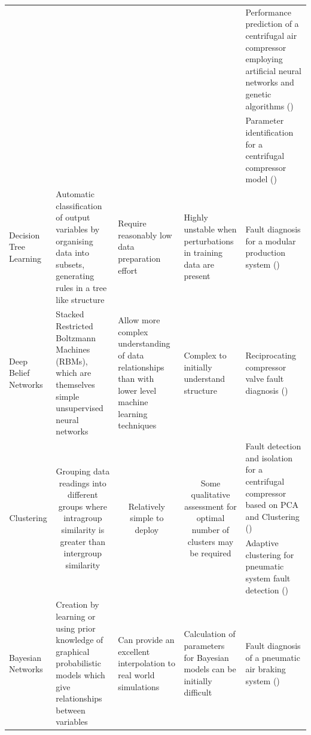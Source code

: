 \begin{center}
\begin{longtable}{p{}p{}p{}p{}p{}}
    \multicolumn{1}{c}{} & \multicolumn{1}{c}{} & \multicolumn{1}{c}{} & \multicolumn{1}{c}{} & Performance prediction of a centrifugal air compressor employing artificial neural networks and genetic algorithms (\cite{LuoFangqiong2011})\\
    \multicolumn{1}{c}{} & \multicolumn{1}{c}{} & \multicolumn{1}{c}{} & \multicolumn{1}{c}{} & Parameter identification for a centrifugal compressor model (\cite{Xiaogang2013})\\
    \midrule
    Decision Tree Learning & Automatic classification of output variables by organising data into subsets, generating rules in a tree like structure & Require reasonably low data preparation effort & Highly unstable when perturbations in training data are present & Fault diagnosis for a modular production system (\cite{Demetgul2013})\\
    \midrule
    Deep Belief Networks & Stacked Restricted Boltzmann Machines (RBMs), which are themselves simple unsupervised neural networks & Allow more complex understanding of data relationships than with lower level machine learning techniques & Complex to initially understand structure & Reciprocating compressor valve fault diagnosis (\cite{Tran2014})\\
    \midrule
    \multicolumn{1}{c}{\multirow{2}[0]{.18\textwidth}{Clustering}} & \multicolumn{1}{c}{\multirow{2}[0]{.18\textwidth}{Grouping data readings into different groups where intragroup similarity is greater than intergroup similarity}} & \multicolumn{1}{c}{\multirow{2}[0]{.18\textwidth}{Relatively simple to deploy}} & \multicolumn{1}{c}{\multirow{2}[0]{.18\textwidth}{Some qualitative assessment for optimal number of clusters may be required}} & Fault detection and isolation for a centrifugal compressor based on PCA and Clustering (\cite{Zanoli2010})\\
    \multicolumn{1}{c}{} & \multicolumn{1}{c}{} & \multicolumn{1}{c}{} & \multicolumn{1}{c}{} & Adaptive clustering for pneumatic system fault detection (\cite{Petkovic2012})\\
    \midrule
    \multirow{2}{.18\textwidth}{Bayesian Networks} & \multirow{2}{.18\textwidth}{Creation by learning or using prior knowledge of graphical probabilistic models which give relationships between variables} & \multirow{2}{.18\textwidth}{Can provide an excellent interpolation to real world simulations} & \multirow{2}{.18\textwidth}{Calculation of parameters for Bayesian models can be initially difficult} & Fault diagnosis of a pneumatic air braking system (\cite{Lingling2010})\\

\end{longtable}
\end{center}
